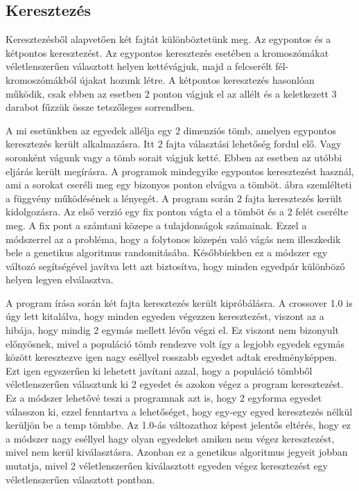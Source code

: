 \documentclass[12ppt,a4paper,oneside]{report}
\begin{document}
            
        \subsection{Keresztezés} %
            
            Keresztezésből alapvetően két fajtát különböztetünk meg.
            Az egypontos és a kétpontos keresztezést.
            Az egypontos keresztezés esetében a kromoszómákat véletlenszerűen választott helyen kettévágjuk, majd a felcserélt fél-kromoszómákból újakat hozunk létre.
            A kétpontos keresztezés hasonlóan működik, csak ebben az esetben 2 ponton vágjuk el az allélt és a keletkezett 3 darabot fűzzük össze tetszőleges sorrendben.
                        
            A mi esetünkben az egyedek allélja egy 2 dimenziós tömb, amelyen egypontos keresztezés került alkalmazásra.
            Itt 2 fajta választási lehetőség fordul elő. Vagy soronként vágunk vagy a tömb sorait vágjuk ketté.
            Ebben az esetben az utóbbi eljárás került megírásra.
            A programok mindegyike egypontos keresztezést használ, ami a sorokat cseréli meg egy bizonyos ponton elvágva a tömböt.
             ábra szemlélteti a függvény működésének a lényegét.
            A program során 2 fajta keresztezés került kidolgozásra.
            Az első verzió egy fix ponton vágta el a tömböt és a 2 felét cserélte meg.
            A fix pont a számtani közepe a tulajdonságok számainak. Ezzel a módszerrel az a probléma, hogy a folytonos közepén való vágás nem illeszkedik bele a genetikus algoritmus randomitásába. Későbbiekben ez a módszer egy változó segítségével javítva lett azt biztosítva, hogy minden egyedpár különböző helyen legyen elválasztva.
            
                     
            A program írása során két fajta keresztezés került kipróbálásra.
            A crossover 1.0 is úgy lett kitalálva, hogy minden egyeden végezzen keresztezést, viszont az a hibája, hogy mindig 2 egymás mellett lévőn végzi el.
            Ez viszont nem bizonyult előnyösnek, mivel a populáció tömb rendezve volt így a legjobb egyedek egymás között keresztezve igen nagy eséllyel rosszabb egyedet adtak eredményképpen.
            Ezt igen egyszerűen ki lehetett javítani azzal, hogy a populáció tömbből véletlenszerűen választunk ki 2 egyedet és azokon végez a program keresztezést.
            Ez a módszer lehetővé teszi a programnak azt is, hogy 2 egyforma egyedet válasszon ki, ezzel fenntartva a lehetőséget, hogy egy-egy egyed keresztezés nélkül kerüljön be a temp tömbbe.
            Az 1.0-ás változathoz képest jelentős eltérés, hogy ez a módszer nagy eséllyel hagy olyan egyedeket amiken nem végez keresztezést, mivel nem kerül kiválasztásra.
            Azonban ez a genetikus algoritmus jegyeit jobban mutatja, mivel 2 véletlenszerűen kiválasztott egyeden végez keresztezést egy véletlenszerűen választott pontban.
            
\end{document}
